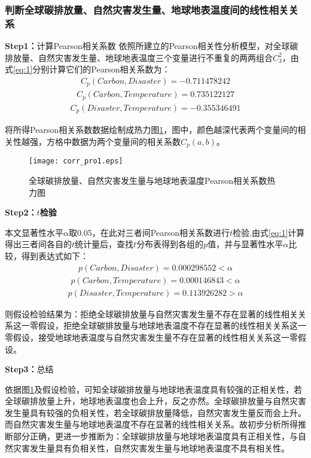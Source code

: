 \documentclass[withoutpreface,bwprint]{cumcmthesis}
\begin{document}
	\subsubsection{判断全球碳排放量、自然灾害发生量、地球地表温度间的线性相关关系}
	\textbf{Step1：}计算Pearson相关系数
	依照所建立的Pearson相关性分析模型，对全球碳排放量、自然灾害发生量、地球地表温度三个变量进行不重复的两两组合$C_3^2$，由式\eqref{eq:1}分别计算它们的Pearson相关系数为：
	\begin{align*}
		{{C}_{p}}(Carbon,Disaster)=-0.711478242 
	\end{align*}
	\begin{align*}
		{{C}_{p}}(Carbon,Temperature)=0.735122127
	\end{align*}
	\begin{align*}
		{{C}_{p}}(Disaster,Temperature)=-0.355346491
	\end{align*}

将所得Pearson相关系数数据绘制成热力图\ref{fig:corrpro1}，图中，颜色越深代表两个变量间的相关性越强，方格中数据为两个变量间的相关系数${{C}_{p}}(a,b)$。
	
	
\begin{figure}[htbp]
	\centering
	\texttt{[image: corr\_pro1.eps]}
	\caption{全球碳排放量、自然灾害发生量与地球地表温度Pearson相关系数热力图}
	\label{fig:corrpro1}
\end{figure}

	\textbf{Step2：$t$检验}
	
	本文显著性水平$\alpha$取0.05，在此对三者间Pearson相关系数进行$t$检验,由式\eqref{eq:1}计算得出三者间各自的$t$统计量后，查找$t$分布表得到各组的$p$值，并与显著性水平$\alpha $比较，得到表达式如下：
	\begin{align*}
		p(Carbon,Disaster)=0.000298552<\alpha
	\end{align*}
	\begin{align*}
		p(Carbon,Temperature)=0.000146843<\alpha
	\end{align*}
	\begin{align*}
		p(Disaster,Temperature)=0.113926282>\alpha
	\end{align*}
	
	则假设检验结果为：拒绝全球碳排放量与自然灾害发生量不存在显著的线性相关关系这一零假设，拒绝全球碳排放量与地球地表温度不存在显著的线性相关关系这一零假设，接受地球地表温度与自然灾害发生量不存在显著的线性相关关系这一零假设。
	
	\textbf{Step3：}总结
	
	依据图\ref{fig:corrpro1}及假设检验，可知全球碳排放量与地球地表温度具有较强的正相关性，若全球碳排放量上升，地球地表温度也会上升，反之亦然。全球碳排放量与自然灾害发生量具有较强的负相关性，若全球碳排放量降低，自然灾害发生量反而会上升。而自然灾害发生量与地球地表温度不存在显著的线性相关关系。故初步分析所得推断部分正确，更进一步推断为：全球碳排放量与地球地表温度具有正相关性，与自然灾害发生量具有负相关性，自然灾害发生量与地球地表温度不具有相关性。
	
\end{document}
